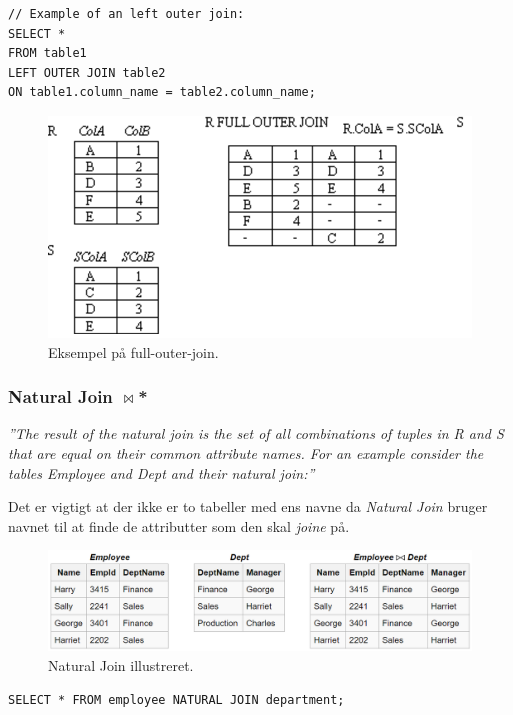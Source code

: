 \begin{lstlisting}[caption=SQL for Left Outer Join,label=code:crossjoin,morekeywords={SELECT, FROM, WHERE, CROSS, JOIN, LEFT, OUTER, ON}]
// Example of an left outer join:
SELECT *
FROM table1
LEFT OUTER JOIN table2
ON table1.column_name = table2.column_name;
\end{lstlisting}

\begin{figure}[H]
\centering
\includegraphics[width=0.6\linewidth]{figs/spm6/fullouterjoin}
\caption{Eksempel på full-outer-join.}
\label{fig:fullouterjoin}
\end{figure}

\subsubsection{Natural Join $\Join$*}

\textit{''The result of the natural join is the set of all combinations of tuples in R and S that are equal on their common attribute names. For an example consider the tables Employee and Dept and their natural join:''}

Det er vigtigt at der ikke er to tabeller med ens navne da \textit{Natural Join} bruger navnet til at finde de attributter som den skal \textit{joine} på.

\begin{figure}[H]
	\centering
	\includegraphics[width=\linewidth]{figs/spm6/naturaljoin}
	\caption{Natural Join illustreret.}
	\label{fig:naturaljoin}
\end{figure}

\begin{lstlisting}[caption=SQL for Cross Join,label=code:crossjoin,morekeywords={SELECT, FROM, WHERE, CROSS, JOIN, NATURAL}]
SELECT * FROM employee NATURAL JOIN department;
\end{lstlisting} 